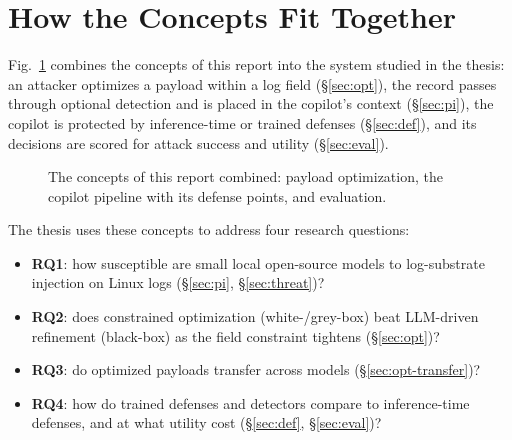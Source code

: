 \section{How the Concepts Fit Together}
\label{sec:synthesis}

Fig.~\ref{fig:pipeline} combines the concepts of this report into the system studied in the thesis: an attacker optimizes a payload within a log field (\S\ref{sec:opt}), the record passes through optional detection and is placed in the copilot's context (\S\ref{sec:pi}), the copilot is protected by inference-time or trained defenses (\S\ref{sec:def}), and its decisions are scored for attack success and utility (\S\ref{sec:eval}).

\begin{figure}[t]
\centering
{}
\caption{The concepts of this report combined: payload optimization, the copilot pipeline with its defense points, and evaluation.}
\label{fig:pipeline}
\end{figure}

The thesis uses these concepts to address four research questions:
\begin{itemize}
\item \textbf{RQ1}: how susceptible are small local open-source models to log-substrate injection on Linux logs (\S\ref{sec:pi}, \S\ref{sec:threat})?
\item \textbf{RQ2}: does constrained optimization (white-/grey-box) beat LLM-driven refinement (black-box) as the field constraint tightens (\S\ref{sec:opt})?
\item \textbf{RQ3}: do optimized payloads transfer across models (\S\ref{sec:opt-transfer})?
\item \textbf{RQ4}: how do trained defenses and detectors compare to inference-time defenses, and at what utility cost (\S\ref{sec:def}, \S\ref{sec:eval})?
\end{itemize}

